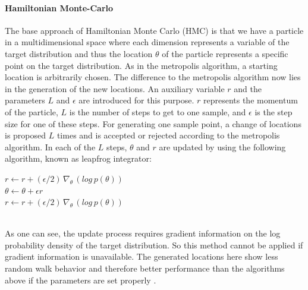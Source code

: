 \documentclass{article}
\begin{document}
\paragraph{Hamiltonian Monte-Carlo}
The base approach of Hamiltonian Monte Carlo (HMC) is that we have a particle in a multidimensional space where each dimension represents a variable of the target distribution and thus the location $\theta$ of the particle represents a specific point on the target distribution. As in the metropolis algorithm, a starting location is arbitrarily chosen. The difference to the metropolis algorithm now lies in the generation of the new locations. An auxiliary variable $r$ and the parameters $L$ and $\epsilon$ are introduced for this purpose. $r$ represents the momentum of the particle, $L$ is the number of steps to get to one sample, and $\epsilon$ is the step size for one of these steps. For generating one sample point, a change of locations is proposed $L$ times and is accepted or rejected according to the metropolis algorithm. In each of the $L$ steps, $\theta$ and $r$ are updated by using the following algorithm, known as leapfrog integrator: 
\begin{algorithm}[h]
	$r \leftarrow r + (\epsilon/2)  \, \nabla_\theta \, (log \, p(\theta))$\\
	$\theta \leftarrow \theta + \epsilon r$\\
	$r \leftarrow r + (\epsilon/2) \, \nabla_\theta \, (log \, p(\theta))$
\end{algorithm}
\\ 
As one can see, the update process requires gradient information on the log probability density of the target distribution. So this method cannot be applied if gradient information is unavailable. The generated locations here show less random walk behavior and therefore better performance than the algorithms above if the parameters are set properly \cite{hoffman2014no}.




\end{document}
